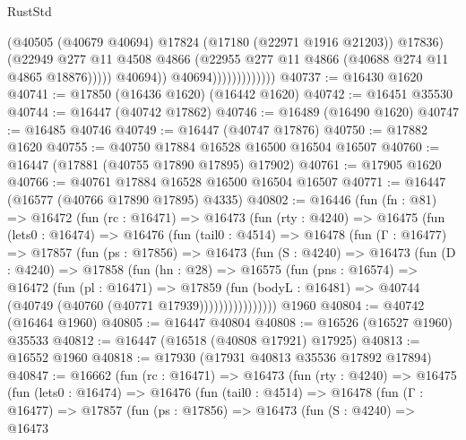 \begin{lexlean}{RustStd}
\begin{coremodule}
{\begin{coremodule}
{{{{{{{{{{{{{{{{{{{{{{{{{{{{{{{{{{{{{{{{{{{{{{{{{{{{{{{                                      (@40505
                                        (@40679 @40694)
                                        @17824
                                        (@17180 (@22971 @1916 @21203))
                                        @17836)
                                      (@22949
                                        @277
                                        @11
                                        @4508
                                        @4866
                                        (@22955 @277 @11 @4866 (@40688 @274 @11 @4865 @18876)))))
                                  @40694))
                              @40694)))))))))))))
@40737 := @16430 @1620
@40741 := @17850 (@16436 @1620) (@16442 @1620)
@40742 := @16451 @35530
@40744 := @16447 (@40742 @17862)
@40746 := @16489 (@16490 @1620)
@40747 := @16485 @40746
@40749 := @16447 (@40747 @17876)
@40750 := @17882 @1620
@40755 := @40750 @17884 @16528 @16500 @16504 @16507
@40760 := @16447 (@17881 (@40755 @17890 @17895) @17902)
@40761 := @17905 @1620
@40766 := @40761 @17884 @16528 @16500 @16504 @16507
@40771 := @16447 (@16577 (@40766 @17890 @17895) @4335)
@40802 := @16446
    (fun (fn : @81) =>
    @16472
      (fun (rc : @16471) =>
      @16473
        (fun (rty : @4240) =>
        @16475
          (fun (lets0 : @16474) =>
          @16476
            (fun (tail0 : @4514) =>
            @16478
              (fun (Γ : @16477) =>
              @17857
                (fun (ps : @17856) =>
                @16473
                  (fun (S : @4240) =>
                  @16473
                    (fun (D : @4240) =>
                    @17858
                      (fun (hn : @28) =>
                      @16575
                        (fun (pns : @16574) =>
                        @16472
                          (fun (pl : @16471) =>
                          @17859
                            (fun (bodyL : @16481) =>
                            @40744 (@40749 (@40760 (@40771 @17939))))))))))))))))
    @1960
@40804 := @40742 (@16464 @1960)
@40805 := @16447 @40804
@40808 := @16526 (@16527 @1960) @35533
@40812 := @16447 (@16518 (@40808 @17921) @17925)
@40813 := @16552 @1960
@40818 := @17930 (@17931 @40813 @35536 @17892 @17894)
@40847 := @16662
    (fun (rc : @16471) =>
    @16473
      (fun (rty : @4240) =>
      @16475
        (fun (lets0 : @16474) =>
        @16476
          (fun (tail0 : @4514) =>
          @16478
            (fun (Γ : @16477) =>
            @17857
              (fun (ps : @17856) =>
              @16473
                (fun (S : @4240) =>
                @16473
}}}}}}}}}}}}}}}}}}}}}}}}}}}}}}}}}}}}}}}}}}}}}}}}}}}}}}}
\end{coremodule}}
\end{coremodule}
\end{lexlean}
